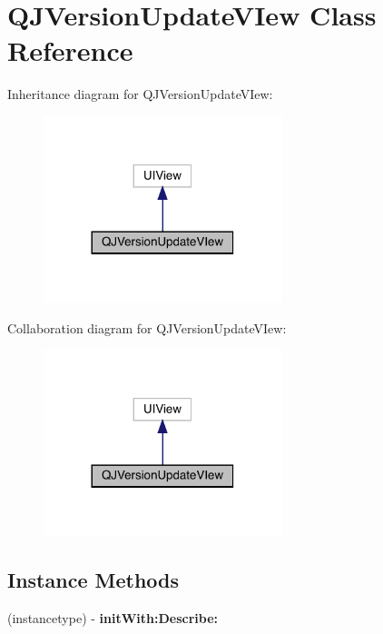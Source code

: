 \hypertarget{interface_q_j_version_update_v_iew}{}\section{Q\+J\+Version\+Update\+V\+Iew Class Reference}
\label{interface_q_j_version_update_v_iew}


Inheritance diagram for Q\+J\+Version\+Update\+V\+Iew\+:\nopagebreak
\begin{figure}[H]
\begin{center}
\leavevmode
\includegraphics[width=197pt]{interface_q_j_version_update_v_iew__inherit__graph}
\end{center}
\end{figure}


Collaboration diagram for Q\+J\+Version\+Update\+V\+Iew\+:\nopagebreak
\begin{figure}[H]
\begin{center}
\leavevmode
\includegraphics[width=197pt]{interface_q_j_version_update_v_iew__coll__graph}
\end{center}
\end{figure}
\subsection*{Instance Methods}
\begin{DoxyCompactItemize}
\item 
\mbox{\label{interface_q_j_version_update_v_iew_adaacdc640a6bf07a6ec63c3d739085bf}} 
(instancetype) -\/ {\bfseries init\+With\+:\+Describe\+:}
\end{DoxyCompactItemize}

